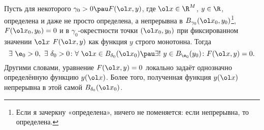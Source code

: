 
	 Пусть для некоторого $\gamma_0>0\pau F(\ol x,y)$, где $\ol x\in\R^M$, $y\in\R$, определена и даже не просто определена, а непрерывна в $B_{\gamma_0}(\ol x_0,y_0)$\footnote{Если
	 я зачеркну «определена», ничего не поменяется: если непрерывна, то определена.}, $F(\ol x_0,y_0) = 0$ и в $\gamma_0$-окрестности точки $(\ol x_0,y_0)$ при фиксированном значении $\ol x$ $F(\ol x,y)$ как функция $y$ строго монотонна.
	 Тогда
	 \[\exists\ \e_0>0,\ \exists\ \delta_0>0\colon \forall \ \ol x\in B_{\delta_0}(\ol x_0)\pau \exists!\ y\in B_{\e_0}(y_0)\colon F(\ol x,y) = 0.\]
	 Другими словами, уравнение $F(\ol x,y) = 0$ локально задаёт однозначно определённую функцию $y(\ol x)$. Более того, полученная функция $y(\ol x)$ непрерывна в этой самой $B_{\delta_0}(\ol x_0)$.
	 